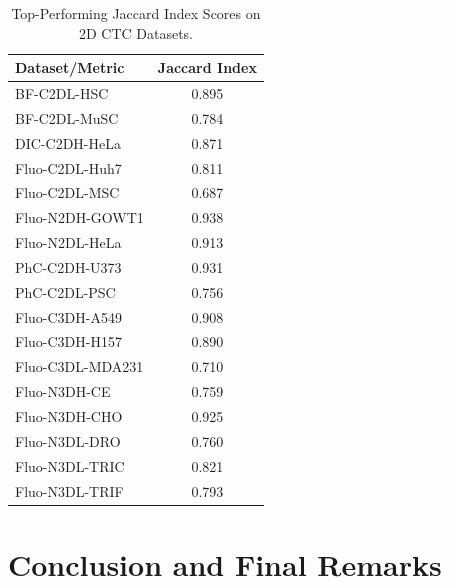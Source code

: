 \documentclass[./dissertation.tex]{subfiles}
\begin{document}
\begin{table}[h] %
    \centering
    \caption{Top-Performing Jaccard Index Scores on 2D CTC Datasets.} %
    \label{tab:ctc_sota_top1_ji} %
    \begin{tabular}{|l|c|} %
        \hline
        Dataset/Metric   & Jaccard Index \\ \hline
        BF-C2DL-HSC      & 0.895         \\ \hline
        BF-C2DL-MuSC     & 0.784         \\ \hline
        DIC-C2DH-HeLa    & 0.871         \\ \hline
        Fluo-C2DL-Huh7   & 0.811         \\ \hline
        Fluo-C2DL-MSC    & 0.687         \\ \hline
        Fluo-N2DH-GOWT1  & 0.938         \\ \hline
        Fluo-N2DL-HeLa   & 0.913         \\ \hline
        PhC-C2DH-U373    & 0.931         \\ \hline
        PhC-C2DL-PSC     & 0.756         \\ \hline
        Fluo-C3DH-A549   & 0.908         \\ \hline
        Fluo-C3DH-H157   & 0.890         \\ \hline
        Fluo-C3DL-MDA231 & 0.710         \\ \hline
        Fluo-N3DH-CE     & 0.759         \\ \hline
        Fluo-N3DH-CHO    & 0.925         \\ \hline
        Fluo-N3DL-DRO    & 0.760         \\ \hline
        Fluo-N3DL-TRIC   & 0.821         \\ \hline
        Fluo-N3DL-TRIF   & 0.793         \\ \hline
    \end{tabular}
\end{table}


\section{Conclusion and Final Remarks}
\end{document}
